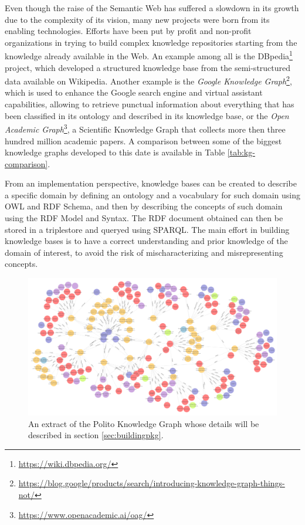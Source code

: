 \documentclass[%
    corpo=13.5pt,
    twoside,
    oldstyle,
    tipotesi=magistrale,
    greek,
    evenboxes
]{toptesi}
\begin{document}
Even though the raise of the Semantic Web has suffered a slowdown in its growth
due to the complexity of its vision, many new projects were born from its
enabling technologies. Efforts have been put by profit and
non-profit organizations in trying to build complex knowledge repositories
starting from the knowledge already available in the Web. An example among all
is the DBpedia\footnote{\url{https://wiki.dbpedia.org/}} project, which
developed a structured knowledge base from the semi-structured data available on
Wikipedia.
Another example is the
\emph{Google Knowledge Graph}\footnote{\url{https://blog.google/products/search/introducing-knowledge-graph-things-not/}},
which is used to enhance the Google search engine and virtual assistant
capabilities, allowing to retrieve punctual information about everything that
has been classified in its ontology and described in its knowledge base, or
the \emph{Open Academic Graph}\footnote{\url{https://www.openacademic.ai/oag/}},
a Scientific Knowledge Graph that collects more then three hundred million
academic papers. A comparison between some of the biggest knowledge graphs
developed to this date is available in Table \ref{tab:kg-comparison}.

From an implementation perspective, knowledge bases can be created to
describe a specific domain by defining an ontology and a vocabulary for
such domain using OWL and RDF Schema, and then by describing the concepts
of such domain using the RDF Model and Syntax. The RDF document obtained
can then be stored in a triplestore and queryed using SPARQL. The main effort
in building knowledge bases is to have a correct understanding and prior
knowledge of the domain of interest, to avoid the risk of mischaracterizing
and misrepresenting concepts.

\begin{figure}[h]
    \centering
    \includegraphics[scale=0.4]{img/geranium-knowledge-base-example.png}
    \caption{An extract of the Polito Knowledge Graph whose details will be
    described in section \ref{sec:buildingpkg}.}
    \label{fig:geranium-knowledge-base-example}
\end{figure}
\end{document}
